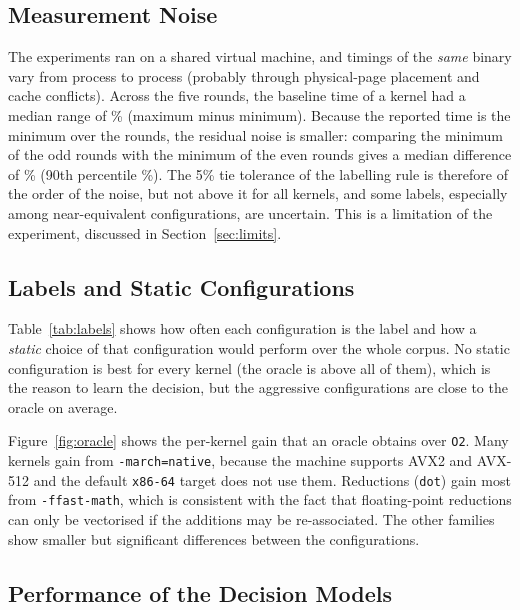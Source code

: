 \subsection{Measurement Noise}

The experiments ran on a shared virtual machine, and timings of the \emph{same} binary
vary from process to process (probably through physical-page placement and
cache conflicts). Across the five rounds, the baseline time of a kernel had a median
range of \noiseSpreadMedian\% (maximum minus minimum). Because the reported time is the
minimum over the rounds, the residual noise is smaller: comparing the minimum of the
odd rounds with the minimum of the even rounds gives a median difference of
\noiseSplitMedian\% (90th percentile \noiseSplitNinety\%). The 5\% tie tolerance of the
labelling rule is therefore of the order of the noise, but not above it for all kernels,
and some labels, especially among near-equivalent configurations, are uncertain.
This is a limitation of the experiment, discussed in Section~\ref{sec:limits}.

\subsection{Labels and Static Configurations}

Table~\ref{tab:labels} shows how often each configuration is the label and how a
\emph{static} choice of that configuration would perform over the whole corpus.
No static configuration is best for every kernel (the oracle is above all of them), which is the reason to learn the decision, but the aggressive configurations are close to the oracle on average.





Figure~\ref{fig:oracle} shows the per-kernel gain that an oracle obtains over \texttt{O2}.
Many kernels gain from \texttt{-march=native}, because the machine supports AVX2 and
AVX-512 and the default \texttt{x86-64} target does not use them. Reductions
(\texttt{dot}) gain most from \texttt{-ffast-math}, which is consistent with the fact that
floating-point reductions can only be vectorised if the additions may be re-associated.
The other families show smaller but significant differences between the configurations.

\subsection{Performance of the Decision Models}

